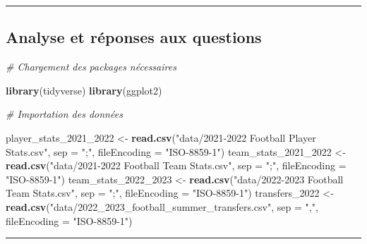 \documentclass[
]{article}
\newenvironment{Shaded}{\begin{snugshade}}{\end{snugshade}}
\newcommand{\AttributeTok}[1]{\textcolor[rgb]{0.13,0.29,0.53}{#1}}
\newcommand{\CommentTok}[1]{\textcolor[rgb]{0.56,0.35,0.01}{\textit{#1}}}
\newcommand{\FunctionTok}[1]{\textcolor[rgb]{0.13,0.29,0.53}{\textbf{#1}}}
\newcommand{\NormalTok}[1]{#1}
\newcommand{\OtherTok}[1]{\textcolor[rgb]{0.56,0.35,0.01}{#1}}
\newcommand{\StringTok}[1]{\textcolor[rgb]{0.31,0.60,0.02}{#1}}
\begin{document}
\begin{center}\rule{0.5\linewidth}{0.5pt}\end{center}

\subsection{\texorpdfstring{\textbf{Analyse et réponses aux
questions}}{Analyse et réponses aux questions}}\label{analyse-et-ruxe9ponses-aux-questions}

\begin{Shaded}
\begin{Highlighting}[]
\CommentTok{\# Chargement des packages nécessaires}

\FunctionTok{library}\NormalTok{(tidyverse)}
\FunctionTok{library}\NormalTok{(ggplot2)}
\end{Highlighting}
\end{Shaded}

\begin{Shaded}
\begin{Highlighting}[]
\CommentTok{\# Importation des données}

\NormalTok{player\_stats\_2021\_2022 }\OtherTok{\textless{}{-}} \FunctionTok{read.csv}\NormalTok{(}\StringTok{"data/2021{-}2022 Football Player Stats.csv"}\NormalTok{, }\AttributeTok{sep =} \StringTok{";"}\NormalTok{, }\AttributeTok{fileEncoding =} \StringTok{"ISO{-}8859{-}1"}\NormalTok{)}
\NormalTok{team\_stats\_2021\_2022 }\OtherTok{\textless{}{-}} \FunctionTok{read.csv}\NormalTok{(}\StringTok{"data/2021{-}2022 Football Team Stats.csv"}\NormalTok{, }\AttributeTok{sep =} \StringTok{";"}\NormalTok{, }\AttributeTok{fileEncoding =} \StringTok{"ISO{-}8859{-}1"}\NormalTok{)}
\NormalTok{team\_stats\_2022\_2023 }\OtherTok{\textless{}{-}} \FunctionTok{read.csv}\NormalTok{(}\StringTok{"data/2022{-}2023 Football Team Stats.csv"}\NormalTok{, }\AttributeTok{sep =} \StringTok{";"}\NormalTok{, }\AttributeTok{fileEncoding =} \StringTok{"ISO{-}8859{-}1"}\NormalTok{)}
\NormalTok{transfers\_2022 }\OtherTok{\textless{}{-}} \FunctionTok{read.csv}\NormalTok{(}\StringTok{"data/2022\_2023\_football\_summer\_transfers.csv"}\NormalTok{, }\AttributeTok{sep =} \StringTok{","}\NormalTok{, }\AttributeTok{fileEncoding =} \StringTok{"ISO{-}8859{-}1"}\NormalTok{)}
\end{Highlighting}
\end{Shaded}

\begin{center}\rule{0.5\linewidth}{0.5pt}\end{center}
\end{document}
